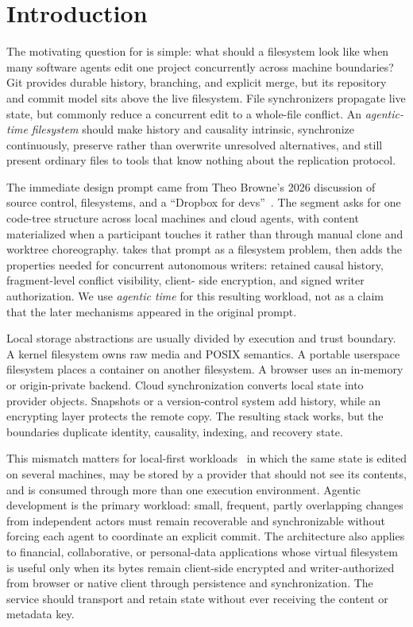 \section{Introduction}
\label{sec:intro}

The motivating question for \sfs{} is simple: what should a filesystem look
like when many software agents edit one project concurrently across machine
boundaries?  Git provides durable history, branching, and explicit merge, but
its repository and commit model sits above the live filesystem.  File
synchronizers propagate live state, but commonly reduce a concurrent edit to a
whole-file conflict.  An \emph{agentic-time filesystem} should make history and
causality intrinsic, synchronize continuously, preserve rather than overwrite
unresolved alternatives, and still present ordinary files to tools that know
nothing about the replication protocol.

The immediate design prompt came from Theo Browne's 2026 discussion of source
control, filesystems, and a ``Dropbox for devs''~\citep{Browne2026Ideas}.  The
segment asks for one code-tree structure across local machines and cloud
agents, with content materialized when a participant touches it rather than
through manual clone and worktree choreography.  \sfs{} takes that prompt as a
filesystem problem, then adds the properties needed for concurrent autonomous
writers: retained causal history, fragment-level conflict visibility, client-
side encryption, and signed writer authorization.  We use \emph{agentic time}
for this resulting workload, not as a claim that the later mechanisms appeared
in the original prompt.

Local storage abstractions are usually divided by execution and trust boundary.
A kernel filesystem owns raw media and POSIX semantics.  A portable userspace
filesystem places a container on another filesystem.  A browser uses an
in-memory or origin-private backend.  Cloud synchronization converts local
state into provider objects.  Snapshots or a version-control system add
history, while an encrypting layer protects the remote copy.  The resulting
stack works, but the boundaries duplicate identity, causality, indexing, and
recovery state.

This mismatch matters for local-first workloads~\citep{Kleppmann2019LocalFirst}
in which the same state is edited on several machines, may be stored by a
provider that should not see its contents, and is consumed through more than
one execution environment.  Agentic development is the primary workload:
small, frequent, partly overlapping changes from independent actors must remain
recoverable and synchronizable without forcing each agent to coordinate an
explicit commit.  The architecture also applies to financial, collaborative,
or personal-data applications whose virtual filesystem is useful only when its
bytes remain client-side encrypted and writer-authorized from browser or native
client through persistence and synchronization.  The service should transport
and retain state without ever receiving the content or metadata key.

